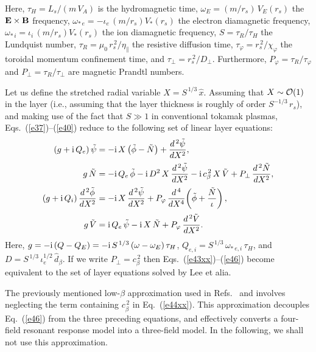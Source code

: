 \documentclass[12pt,prb,aps]{revtex4-1}
\begin{document}
Here, 
$\tau_H = L_s/(m\,V_A)$ 
is the  hydromagnetic time, 
$\omega_E =(m/r_s)\,V_E(r_s)$
  the 
 ${\bf E}\times {\bf B}$ frequency, 
$\omega_{\ast\,e} = -\iota_e\,(m/r_s)V_\ast(r_s)$
the electron diamagnetic frequency,
$\omega_{\ast\,i} =\iota_i\,(m/r_s)V_\ast(r_s)$
 the  ion diamagnetic frequency,  $S=\tau_R/\tau_H$ the  Lundquist number, 
$\tau_R = \mu_0\,r_s^{\,2}/\eta_\parallel$
 the
 resistive diffusion time, 
$\tau_\varphi
= r_s^{\,2}/\chi_\varphi$
the  toroidal momentum confinement time, and 
$\tau_\perp = r_s^{\,2}/D_\perp$.
  Furthermore, $P_\varphi = \tau_R/\tau_\varphi$ and $P_\perp = \tau_R/\tau_\perp$ are magnetic Prandtl numbers.

 Let us define the stretched radial variable $X = S^{\,1/3}\,\hat{x}$.
Assuming that $X\sim{\cal O}(1)$ in the layer (i.e., assuming that the layer thickness is roughly of order $S^{-1/3}\,r_s$),
and making use of the fact that $S\gg 1$ in conventional tokamak plasmas,  Eqs.~(\ref{e37})--(\ref{e40}) reduce to the following
set of linear layer equations:\,\cite{cole}
\begin{align}\label{e43xx}
(g+{\rm i}\,Q_e)\,\tilde{\psi}&= - {\rm i}\,X\left(\tilde{\phi}-\tilde{N}\right)+ \frac{d^{\,2}\tilde{\psi}}{d X^2},\\[0.5ex]
g\,\tilde{N} &= - {\rm i}\,Q_{e}\,\tilde{\phi}   - {\rm i} \,D^{2}\,X\,\frac{d^{\,2}\tilde{\psi}}{dX^{2}}- {\rm i}\,c_\beta^{\,2}\,X\,\tilde{V}
+ P_\perp\,\frac{d^{\,2} \tilde{N}}{dX^{2}},\label{e44xx}\\[0.5ex]
(g+{\rm i}\,Q_i)\,\frac{d^{\,2}\tilde{\phi}}{dX^2}&= - {\rm i}\,X\,\frac{d^{\,2}\tilde{\psi}}{dX^2}+ P_\varphi\,\frac{d^{\,4}}{dX^4}\!\left(\tilde{\phi} + \frac{\tilde{N}}{\iota}\right),\\[0.5ex]
g\,\tilde{V} &= {\rm i}\,Q_{e}\,\tilde{\psi} - {\rm i}\,X\,\tilde{N} + P_\varphi\,\frac{d^{\,2}\tilde{V}}{dX^{2}}.\label{e46}
\end{align}
Here, $g = -{\rm i}\,(Q-Q_E)=-{\rm i}\,S^{\,1/3}\,(\omega-\omega_E)\,\tau_H$, $Q_{e,i} = S^{\,1/3}\,\omega_{\ast\,e,i}\,\tau_H$,
and $D = S^{\,1/3}\,\iota_e^{1/2}\,\hat{d}_\beta$. If we write $P_\perp = c_\beta^{\,2}$
then Eqs.~(\ref{e43xx})--(\ref{e46}) become equivalent to the set of  layer equations solved by Lee et alia.


The previously mentioned low-$\beta$ approximation used in Refs.~ and  involves neglecting the term
containing $c_\beta^{\,2}$ in Eq.~(\ref{e44xx}). This approximation decouples Eq.~(\ref{e46}) from the three preceding equations, and effectively
converts a four-field resonant response model into a three-field model. In the following, we shall not use this approximation.
\end{document}
